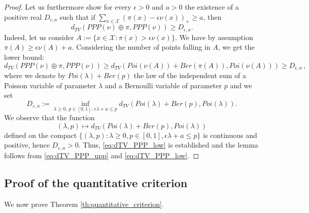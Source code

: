 \documentclass[12pt,a4paper]{article}
\newcommand{\1}[1]{{\mathbf 1}{\{#1\}}}
\newcommand{\8}{{\infty}}
\newcommand{\gep}{\varepsilon}
\begin{document}
\begin{proof}
Let us furthermore show for every $\epsilon >0$ and $a>0$ the existence of a positive real $D_{\epsilon, a}$ such that if 
$\sum_{x\in \mathcal{X}} \left(\pi(x)-\epsilon \nu(x)\right)_+  \ge a$, then 
  \begin{equation}\label{eq:dTV_PPP_low}
  d_{TV}( PPP(\nu) \oplus \pi, PPP(\nu)) \ge D_{\epsilon, a}.
\end{equation}
Indeed, let us consider $A:=\{ x \in \mathcal{X}: \pi(x)  > \epsilon \nu(x)\}$. We have by assumption $\pi(A) \ge \epsilon \nu(A) +a$. Considering the number of points falling in $A$, we get the lower bound:
$$d_{TV}( PPP(\nu) \oplus \pi, PPP(\nu))
\ge d_{TV}( Poi(\nu(A))+Ber(\pi(A)), Poi(\nu(A))) 
\ge D_{\epsilon, a} \, , $$
where we denote by $Poi(\lambda)+Ber(p)$ the law of the independent sum of a Poisson variable of parameter $\lambda$ and a Bernoulli variable of parameter $p$ and we set 
$$D_{\gep, a}  := 
\inf_{\lambda \ge 0, \,  p\in [0, 1]:\, \epsilon \lambda +a\le p} 
d_{TV}(Poi(\lambda)+Ber(p), Poi(\lambda)).$$
We observe that the function 
$$ (\lambda,p) \mapsto  d_{TV}(Poi(\lambda)+Ber(p), Poi(\lambda))$$
defined on the compact   
$\{(\lambda, p): \lambda \ge 0, p\in [0, 1], \epsilon \lambda+a\le p \}$ 
is continuous and positive, hence $D_{\gep, a}>0$. 
Thus, \eqref{eq:dTV_PPP_low} is established and the lemma follows from \eqref{eq:dTV_PPP_upp} and \eqref{eq:dTV_PPP_low}.
\end{proof}




\subsection{Proof of the quantitative criterion}\label{sec:proof_quantitative}

We now prove Theorem \ref{th:quantitative_criterion}.
\end{document}
